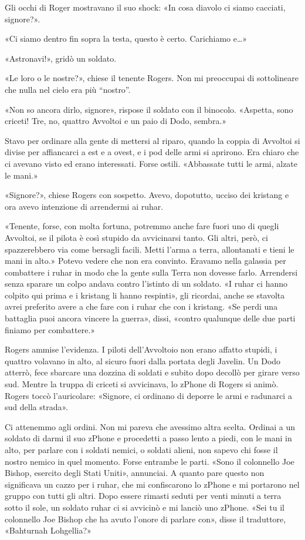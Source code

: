 Gli occhi di Roger mostravano il suo shock: «In cosa diavolo ci siamo
cacciati, signore?».

«Ci siamo dentro fin sopra la testa, questo è certo. Carichiamo e\ldots»

«Astronavi!», gridò un soldato.

«Le loro o le nostre?», chiese il tenente Rogers. Non mi preoccupai di
sottolineare che nulla nel cielo era più ``nostro''.

«Non so ancora dirlo, signore», rispose il soldato con il binocolo.
«Aspetta, sono criceti! Tre, no, quattro Avvoltoi e un paio di Dodo,
sembra.»

Stavo per ordinare alla gente di mettersi al riparo, quando la coppia di
Avvoltoi si divise per affiancarci a est e a ovest, e i pod delle armi
si aprirono. Era chiaro che ci avevano visto ed erano interessati. Forse
ostili. «Abbassate tutti le armi, alzate le mani.»

«Signore?», chiese Rogers con sospetto. Avevo, dopotutto, ucciso dei
kristang e ora avevo intenzione di arrendermi ai ruhar.

«Tenente, forse, con molta fortuna, potremmo anche fare fuori uno di
quegli Avvoltoi, se il pilota è così stupido da avvicinarsi tanto. Gli
altri, però, ci spazzerebbero via come bersagli facili. Metti l'arma a
terra, allontanati e tieni le mani in alto.» Potevo vedere che non era
convinto. Eravamo nella galassia per combattere i ruhar in modo che la
gente sulla Terra non dovesse farlo. Arrendersi senza sparare un colpo
andava contro l'istinto di un soldato. «I ruhar ci hanno colpito qui
prima e i kristang li hanno respinti», gli ricordai, anche se stavolta
avrei preferito avere a che fare con i ruhar che con i kristang. «Se
perdi una battaglia puoi ancora vincere la guerra», dissi, «contro
qualunque delle due parti finiamo per combattere.»

Rogers ammise l'evidenza. I piloti dell'Avvoltoio non erano affatto
stupidi, i quattro volavano in alto, al sicuro fuori dalla portata degli
Javelin. Un Dodo atterrò, fece sbarcare una dozzina di soldati e subito
dopo decollò per girare verso sud. Mentre la truppa di criceti si
avvicinava, lo zPhone di Rogers si animò. Rogers toccò l'auricolare:
«Signore, ci ordinano di deporre le armi e radunarci a sud della
strada».

Ci attenemmo agli ordini. Non mi pareva che avessimo altra scelta.
Ordinai a un soldato di darmi il suo zPhone e procedetti a passo lento a
piedi, con le mani in alto, per parlare con i soldati nemici, o soldati
alieni, non sapevo chi fosse il nostro nemico in quel momento. Forse
entrambe le parti. «Sono il colonnello Joe Bishop, esercito degli Stati
Uniti», annunciai. A quanto pare questo non significava un cazzo per i
ruhar, che mi confiscarono lo zPhone e mi portarono nel gruppo con tutti
gli altri. Dopo essere rimasti seduti per venti minuti a terra sotto il
sole, un soldato ruhar ci si avvicinò e mi lanciò uno zPhone. «Sei tu il
colonnello Joe Bishop che ha avuto l'onore di parlare con», disse il
traduttore, «Bahturnah Lohgellia?»

